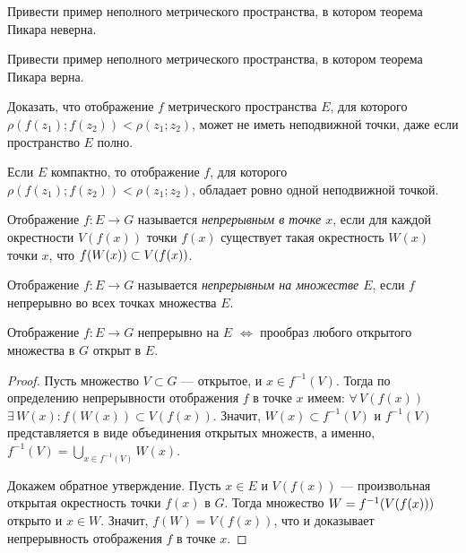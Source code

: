 \documentclass[12pt,titlepage, a4paper]{article}
\begin{document}
\begin{upr}
Привести пример неполного метрического пространства, в котором
теорема Пикара неверна.
\end{upr}

\begin{upr}
Привести пример неполного метрического пространства, в котором
теорема Пикара верна.
\end{upr}

\begin{upr}
Доказать, что отображение $f$ метрического пространства $E$, для
которого $\rho(f(z_1);f(z_2))<\rho(z_1;z_2)$, может не иметь
неподвижной точки, даже если пространство $E$ полно.
\end{upr}

\begin{upr}
Если $E$ компактно, то отображение $f$, для которого
$\rho(f(z_1);f(z_2))<\rho(z_1;z_2)$, обладает ровно одной
неподвижной точкой.
\end{upr}
\clearpage

\lecture

\vspace{-20pt}


\begin{defen}
Отображение $f\colon E\to G$ называется \emph{непрерывным в точке
$x$}, если для каждой окрестности $V(f(x))$ точки $f(x)$ существует
такая окрестность $W(x)$ точки $x$, что $f(W(x))\p\subset V(f(x))$.
\end{defen}

\begin{defen}
Отображение $f\colon E\to G$ называется \emph{непрерывным на
множестве $E$}, если $f$ непрерывно во всех точках множества $E$.
\end{defen}

\begin{predl}
Отображение $f\colon E\to G$ непрерывно на $E$ $\Leftrightarrow$
прообраз любого открытого множества в $G$ открыт в $E$.
\end{predl}

\begin{proof}
Пусть множество $V\subset G$ --- открытое, и $x\in f^{-1}(V)$. Тогда
по определению непрерывности отображения $f$ в точке $x$ имеем:
$\forall\,V(f(x))$\;\;$\exists\,W(x):f(W(x))\subset V(f(x))$.
Значит, $W(x)\subset f^{-1}(V)$ и $f^{-1}(V)$ представляется в виде
объединения открытых множеств, а именно,
$f^{-1}(V)=\bigcup\limits_{x\in f^{-1}(V)}W(x)$.

Докажем обратное утверждение. Пусть $x\in E$ и $V(f(x))$ ---
произвольная открытая окрестность точки $f(x)$ в $G$. Тогда
множество $W\p=f^{-1}(V(f(x)))$ открыто и $x\in W$. Значит,
$f(W)=V(f(x))$, что и доказывает непрерывность отображения $f$ в
точке $x$.
\end{proof}
\end{document}
